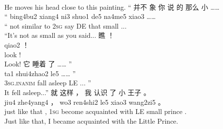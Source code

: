 \documentclass[UTF8]{ctexart}
\begin{document}
\begin{exe}
\\
\trans He moves his head close to this painting.
\ex
\glll
“ 并不 象 你 说 的 那么 小 ……
\\
“ bing4bu2 xiang4 ni3 shuo1 de5 na4me5 xiao3 ……
\\
`` not {similar to} \textsc{2sg} say DE that small ...
\\
\trans ``It's not as small as you said...
\ex
\glll
瞧 ！
\\
qiao2 ！
\\
look !
\\
\trans Look!
\ex
\glll
它 睡着 了 …… ”
\\
ta1 shui4zhao2 le5 …… ”
\\
\textsc{3sg.inanim} {fall asleep} LE ... ''
\\
\trans It fell asleep...''
\ex
\glll
就 这样 ， 我 认识 了 小 王子 。
\\
jiu4 zhe4yang4 ， wo3 ren4shi2 le5 xiao3 wang2zi5 。
\\
just {like that} , \textsc{1sg} {become acquainted with} LE small prince .
\\
\trans Just like that, I became acquainted with the Little Prince.
\end{exe}
\end{document}
